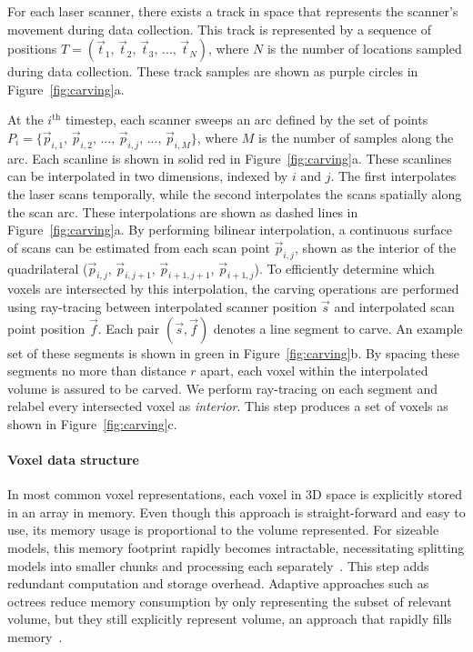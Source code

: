 \documentclass[10pt,twocolumn,letterpaper]{article}
\begin{document}
For each laser scanner, there exists a track in space that represents the scanner's movement during data collection.  This track is represented by a sequence of positions $T = (\vec{t}_{1},\,\vec{t}_{2},\,\vec{t}_{3},\,...,\,\vec{t}_{N})$, where $N$ is the number of locations sampled during data collection.  These track samples are shown as purple circles in Figure~\ref{fig:carving}a.

At the $i^{\text{th}}$ timestep, each scanner sweeps an arc defined by the set of points $P_{i} = \{\vec{p}_{i,1},\,\vec{p}_{i,2},\,...,\,\vec{p}_{i,j},\,...,\,\vec{p}_{i,M}\}$, where $M$ is the number of samples along the arc.  Each scanline is shown in solid red in Figure~\ref{fig:carving}a.  These scanlines can be interpolated in two dimensions, indexed by $i$ and $j$.  The first interpolates the laser scans temporally, while the second interpolates the scans spatially along the scan arc.  These interpolations are shown as dashed lines in Figure~\ref{fig:carving}a.  By performing bilinear interpolation, a continuous surface of scans can be estimated from each scan point $\vec{p}_{i,j}$, shown as the interior of the quadrilateral ($\vec{p}_{i,j}$, $\vec{p}_{i,j+1}$, $\vec{p}_{i+1,j+1}$, $\vec{p}_{i+1,j}$).  To efficiently determine which voxels are intersected by this interpolation, the carving operations are performed using ray-tracing between interpolated scanner position $\vec{s}$ and interpolated scan point position $\vec{f}$.  Each pair $(\vec{s}, \vec{f})$ denotes a line segment to carve.  An example set of these segments is shown in green in Figure~\ref{fig:carving}b.  By spacing these segments no more than distance $r$ apart, each voxel within the interpolated volume is assured to be carved.  We perform ray-tracing on each segment and relabel every intersected voxel as {\it interior}.  This step produces a set of voxels as shown in Figure~\ref{fig:carving}c.

\paragraph*{Voxel data structure}

In most common voxel representations, each voxel in 3D space is explicitly stored in an array in memory.  Even though this approach is straight-forward and easy to use, its memory usage is proportional to the volume represented.  For sizeable models, this memory footprint rapidly becomes intractable, necessitating splitting models into smaller chunks and processing each separately~\cite{Carving}.  This step adds redundant computation and storage overhead.  Adaptive approaches such as octrees reduce memory consumption by only representing the subset of relevant volume, but they still explicitly represent volume, an approach that rapidly fills memory~\cite{OctreeSculpting,Yang05}.
\end{document}
